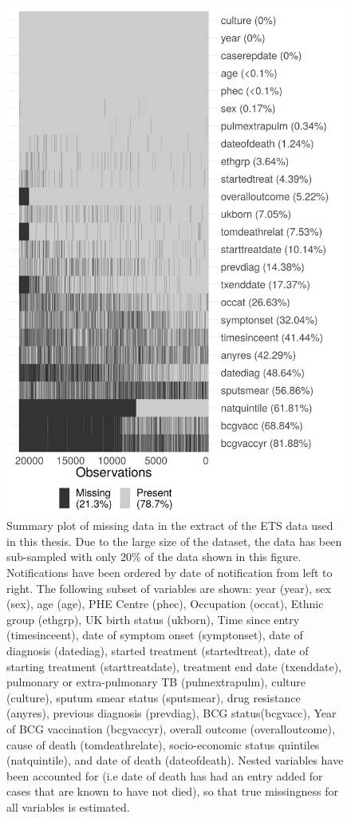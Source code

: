 \documentclass[11pt,twoside]{bristolthesis}
\begin{document}
  \begin{figure}
  
  {\centering \includegraphics[width=0.6\linewidth,]{chapters/tb-epi-england/figures/plot-missing-struct} 
  
  }
  
  \caption[Summary plot of missing data in the extract of the ETS data used in this thesis.]{Summary plot of missing data in the extract of the ETS data used in this thesis. Due to the large size of the dataset, the data has been sub-sampled with only 20\% of the data shown in this figure. Notifications have been ordered by date of notification from left to right. The following subset of variables are shown: year (year), sex (sex), age (age), PHE Centre (phec), Occupation (occat), Ethnic group (ethgrp), UK birth status (ukborn), Time since entry (timesinceent), date of symptom onset (symptonset), date of diagnosis (datediag), started treatment (startedtreat), date of starting treatment (starttreatdate), treatment end date (txenddate), pulmonary or extra-pulmonary TB (pulmextrapulm), culture (culture), sputum smear status (sputsmear), drug resistance (anyres), previous diagnosis (prevdiag), BCG status(bcgvacc), Year of BCG vaccination (bcgvaccyr), overall outcome (overalloutcome), cause of death (tomdeathrelate), socio-economic status quintiles (natquintile), and date of death (dateofdeath). Nested variables have been accounted for (i.e date of death has had an entry added for cases that are known to have not died), so that true missingness for all variables is estimated.}\label{fig:plot-missing-struct}
  \end{figure}
\end{document}
